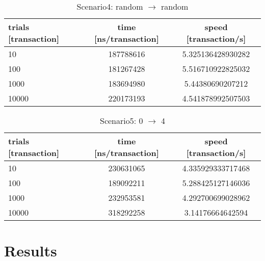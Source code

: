 \documentclass[a4j,11pt,uplatex,onecolumn]{article}
\begin{document}
\begin{table}[htb]
  \begin{center}
    \caption{Scenario4: random $\rightarrow$ random}
    \begin{tabular}{|l|c|c|} \hline
        trials [transaction] & time [ns/transaction] & speed [transaction/s]\\ \hline \hline
        10 & 187788616 & 5.325136428930282 \\
        100 & 181267428 & 5.516710922825032 \\
        1000 & 183694980 & 5.44380690207212 \\
        10000 & 220173193 & 4.541878992507503 \\ \hline
    \end{tabular}
  \end{center}
\end{table}

\begin{table}[htb]
  \begin{center}
    \caption{Scenario5: 0 $\rightarrow$ 4}
    \begin{tabular}{|l|c|c|} \hline
        trials [transaction] & time [ns/transaction] & speed [transaction/s]\\ \hline \hline
        10 & 230631065 & 4.335929333717468 \\
        100 & 189092211 & 5.288425127146036 \\
        1000 & 232953581 & 4.292700699028962 \\
        10000 & 318292258 & 3.14176664642594 \\ \hline
    \end{tabular}
  \end{center}
\end{table}


\section{Results}
\end{document}

